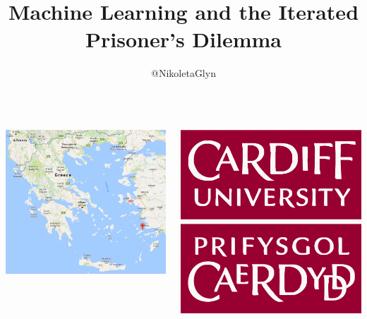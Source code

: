 \documentclass{beamer}
\title{Machine Learning and the Iterated Prisoner's Dilemma}
\author{@NikoletaGlyn}
\date{}
\institute[]
{
}
\begin{document}
\maketitle  

\begin{frame}
    \begin{columns}[T] %
    \begin{column}{.5\textwidth}
         \includegraphics[width=\textwidth]{static/kos.png}
    \end{column}%
    \begin{column}{.23\textwidth}
        \includegraphics[width=\textwidth]{static/cardiff_uni_logo.jpg}


\end{column}
\end{columns}
\end{frame}
\end{document}
